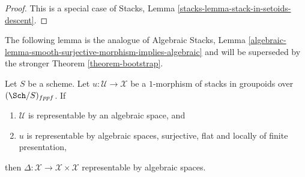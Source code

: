 \begin{proof}
This is a special case of
Stacks, Lemma \ref{stacks-lemma-stack-in-setoids-descent}.
\end{proof}

\noindent
The following lemma is the analogue of
Algebraic Stacks, Lemma
\ref{algebraic-lemma-smooth-surjective-morphism-implies-algebraic}
and will be superseded by the stronger
Theorem \ref{theorem-bootstrap}.

\begin{lemma}
\label{lemma-flat-finite-presentation-surjective-diagonal}
Let $S$ be a scheme.
Let $u : \mathcal{U} \to \mathcal{X}$ be a $1$-morphism of
stacks in groupoids over $(\Sch/S)_{fppf}$. If
\begin{enumerate}
\item $\mathcal{U}$ is representable by an algebraic space, and
\item $u$ is representable by algebraic spaces, surjective, flat and
locally of finite presentation,
\end{enumerate}
then
$\Delta : \mathcal{X} \to \mathcal{X} \times \mathcal{X}$
representable by algebraic spaces.
\end{lemma}

